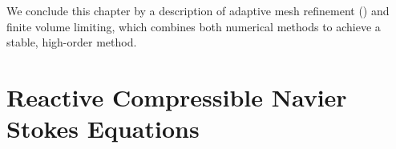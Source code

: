 We conclude this chapter by a description of adaptive mesh refinement (\amr) and finite volume limiting, which combines both numerical methods to achieve a stable, high-order method.

\section{Reactive Compressible Navier Stokes Equations}\label{sec:navier-stokes}
\newcommand{\diffCoeff}{\varepsilon}
\newcommand{\hyperFluxDef}{
  \begin{pmatrix}
    \Qj \\
    \Qv  \otimes \Qj + \bm{I} \pressure  \\
    \Qv \cdot (\bm{I} \QE + \bm{I} \pressure) \\
    \Qj \QZZ
  \end{pmatrix}
}

\newcommand{\viscFluxDef}{
  \begin{pmatrix}
     -\diffCoeff \gradient{\Qrho}\\
     \stressT (\Q, \gradQ)  \\
     \Qv \cdot \stressT (\Q, \gradQ) - \kappa \gradient{T}\\
     -\diffCoeff \gradient{\QZ}
   \end{pmatrix}
}

